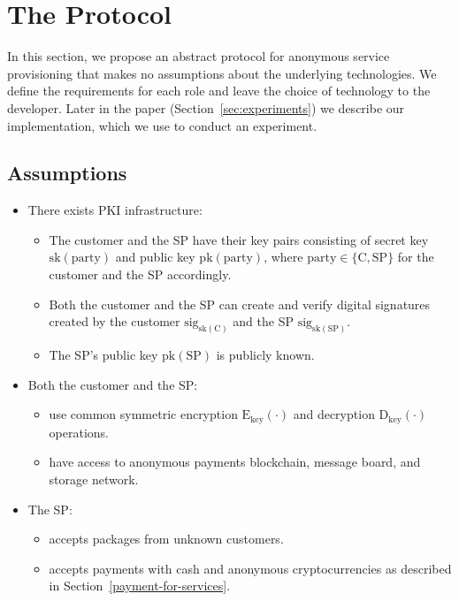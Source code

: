 \documentclass[pdftex,twocolumn,epjc3]{svjour3}
\begin{document}
{\section{The Protocol}\label{sec:protocol}
In this section, we propose an abstract protocol for anonymous service provisioning that makes no assumptions about the underlying technologies. We define the requirements for each role and leave the choice of technology to the developer. Later in the paper (Section~\ref{sec:experiments}) we describe our implementation, which we use to conduct an experiment.

\subsection{Assumptions}

\begin{itemize}
\item There exists PKI infrastructure:
    \begin{itemize}
        \item The customer and the SP have their key pairs consisting of secret key $\mathrm{sk}(\mathrm{party})$ and public key $\mathrm{pk}(\mathrm{party})$, where $\mathrm{party} \in \{\mathrm{C}, \mathrm{SP}\}$ for the customer and the SP accordingly.
        \item Both the customer and the SP can create and verify digital signatures created by the customer $\mathrm{sig}_{\mathrm{sk}(\mathrm{C})}$ and the SP $\mathrm{sig}_{\mathrm{sk}(\mathrm{SP})}$.
        \item The SP's public key $\mathrm{pk}(\mathrm{SP})$ is publicly known.
    \end{itemize}
    
\item Both the customer and the SP:
    \begin{itemize}
        \item use common symmetric encryption $\mathrm{E}_\mathrm{key}(\cdot)$ and decryption $\mathrm{D}_\mathrm{key}(\cdot)$ operations.
        \item have access to anonymous payments blockchain, message board, and storage network.
    \end{itemize}

\item The SP:
    \begin{itemize}
        \item accepts packages from unknown customers.
        \item accepts payments with cash and anonymous cryptocurrencies as described in Section~\ref{payment-for-services}.
    \end{itemize}
    

\end{itemize}}
\end{document}
